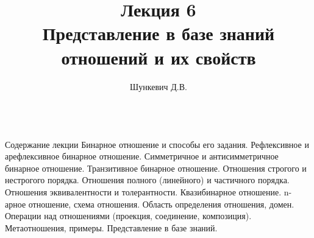 \title{Лекция 6\\Представление в базе знаний отношений и их свойств}   
\author[]{Шункевич Д.В.}

\begin{frame}
	\titlepage
\end{frame}

\begin{frame}{\\Содержание лекции}
	\topline
	\justifying
	Бинарное отношение и способы его задания. Рефлексивное и арефлексивное бинарное отношение. Симметричное и антисимметричное бинарное отношение. Транзитивное бинарное отношение. Отношения строгого и нестрогого порядка. Отношения полного (линейного) и частичного порядка. Отношения эквивалентности и толерантности. Квазибинарное отношение. n-арное отношение, схема отношения. Область определения отношения, домен. Операции над отношениями (проекция, соединение, композиция). Метаотношения, примеры. Представление в базе знаний.
\end{frame}